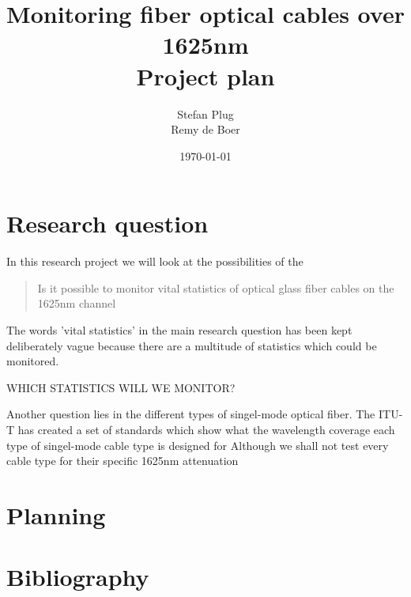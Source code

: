 \documentclass{article}
\begin{document}
\title{Monitoring fiber optical cables over 1625nm\\Project plan}
\author{Stefan Plug\\Remy de Boer}
\date{\today}
\maketitle

\section{Research question}
In this research project we will look at the possibilities of the 
\begin{quote}
Is it possible to monitor vital statistics of optical glass fiber cables on the 1625nm channel
\end{quote}

The words 'vital statistics' in the main research question has been kept deliberately vague because there are a multitude of statistics which could be monitored. 

WHICH STATISTICS WILL WE MONITOR?

Another question lies in the different types of singel-mode optical fiber. The ITU-T has created a set of standards which show what the wavelength coverage each type of singel-mode cable type is designed for \cite[p.~21]{refguide:2011} Although we shall not test every cable type for their specific 1625nm attenuation 




\section{Planning}

\section{Bibliography}


\end{document}
